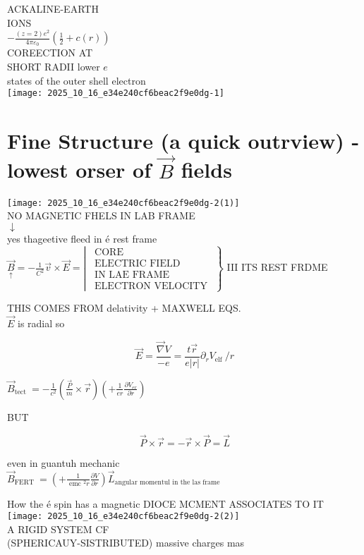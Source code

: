 ACKALINE-EARTH\\
IONS\\
$-\frac{(z=2) e^{2}}{4 \pi \varepsilon_{0}}\left(\frac{1}{2}+c(r)\right)$\\
COREECTION AT\\
SHORT RADII lower $e$\\
states of the outer shell electron\\
\texttt{[image: 2025\_10\_16\_e34e240cf6beac2f9e0dg-1]}

\section*{Fine Structure (a quick outrview) - lowest orser of $\vec{B}$ fields}
\texttt{[image: 2025\_10\_16\_e34e240cf6beac2f9e0dg-2(1)]}\\
NO MAGNETIC FHELS IN LAB FRAME\\
$\downarrow$\\
yes thageetive fleed in é rest frame\\
$\left.\underset{\uparrow}{\vec{B}}=-\frac{1}{C^{2}} \vec{v} \times \vec{E}=\left\lvert\, \begin{array}{c}\text { CORE } \\ \text { ELECTRIC FIELD } \\ \text { IN LAE FRAME } \\ \text { ELECTRON VELOCITY }\end{array}\right.\right\}$ III ITS REST FRDME

THIS COMES FROM delativity + MAXWELL EQS.\\
$\vec{E}$ is radial so

$$
\vec{E}=\frac{\vec{\nabla} V}{-e}=\frac{t \vec{r}}{e|r|} \partial_{r} V_{\text {elf }} / r
$$

$\vec{B}_{\text {tect }}=-\frac{1}{c^{2}}\left(\frac{\vec{P}}{m} \times \vec{r}\right)\left(+\frac{1}{e r} \frac{\partial V_{e r}}{\partial r}\right)$

BUT

$$
\vec{P} \times \vec{r}=-\vec{r} \times \vec{P}=\vec{L}
$$

even in guantuh mechanic\\
$\vec{B}_{\text {FERT }}=\left(+\frac{1}{\text { emc }{ }^{2} r} \frac{\partial V}{\partial r}\right) \vec{L}_{\text {angular momentul in the las frame }}$

How the é spin has a magnetic DIOCE MCMENT ASSOCIATES TO IT\\
\texttt{[image: 2025\_10\_16\_e34e240cf6beac2f9e0dg-2(2)]}\\
A RIGID SYSTEM CF\\
(SPHERICAUY-SISTRIBUTED) massive charges mas

